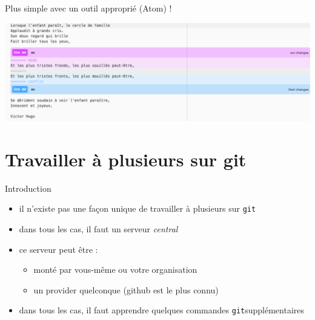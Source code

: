 \begin{frame}{%
\protect\hypertarget{plus-simple-avec-un-outil-appropriuxe9-atom}{%
Plus simple avec un outil approprié (Atom) !}}

\includegraphics[width=1\textwidth]{images/fusion.png}

\end{frame}

\hypertarget{travailler-uxe0-plusieurs-sur-git}{%
\section{Travailler à plusieurs sur
git}\label{travailler-uxe0-plusieurs-sur-git}}

\begin{frame}[fragile]{%
\protect\hypertarget{introduction}{%
Introduction}}

\begin{itemize}
\tightlist
\item
  il n’existe pas une façon unique de travailler à plusieurs sur
  \texttt{git}
\item
  dans tous les cas, il faut un serveur \emph{central}
\item
  ce serveur peut être :

  \begin{itemize}
  \tightlist
  \item
    monté par vous-même ou votre organisation
  \item
    un provider quelconque (github est le plus connu)
  \end{itemize}
\item
  dans tous les cas, il faut apprendre quelques commandes
  \texttt{git}supplémentaires
\end{itemize}

\end{frame}

